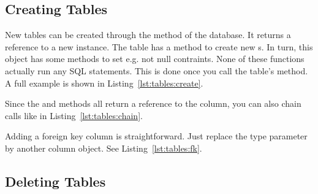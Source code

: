 
\subsection{Creating Tables}
\label{section:tables:create}

New tables can be created through the  method of the database. It returns a reference to a new  instance. The table has a method to create new s. In turn, this object has some methods to set e.g. not null contraints. None of these functions actually run any SQL statements. This is done once you call the table's  method.  A full example is shown in Listing~\ref{lst:tables:create}.



Since the  and  methods all return a reference to the column, you can also chain calls like in Listing~\ref{lst:tables:chain}.



Adding a foreign key column is straightforward. Just replace the type parameter by another column object. See Listing~\ref{lst:tables:fk}.




\subsection{Deleting Tables}
\label{section:tables:delete}


